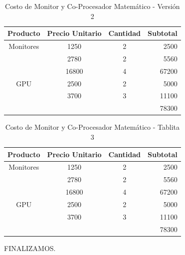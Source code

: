 \documentclass[]{article}
\begin{document}
\begin{table}[h]
	\centering
	\begin{tabular}{cccr}
		\hline
		Producto & Precio Unitario & Cantidad & Subtotal \\
		\hline
		Monitores & 1250 & 2 & 2500\\
		& 2780 & 2 & 5560 \\
		& 16800 & 4 & 67200 \\
		\hline
		GPU	 	  & 2500 & 2 & 5000\\
		& 3700 & 3 & 11100\\
		\cline{4-4}
		&      &   & 78300
	\end{tabular}
	\caption{Costo de Monitor y Co-Procesador Matemático - Versión 2}
	\label{table:2}
\end{table}

\lipsum[11-14]
\begin{table}[h]
	\centering
	\begin{tabular}{cccr}
		\hline
		Producto & Precio Unitario & Cantidad & Subtotal \\
		\hline
		Monitores & 1250 & 2 & 2500\\
		& 2780 & 2 & 5560 \\
		& 16800 & 4 & 67200 \\
		\hline
		GPU	 	  & 2500 & 2 & 5000\\
		& 3700 & 3 & 11100\\
		\cline{4-4}
		&      &   & 78300
	\end{tabular}
	\caption{Costo de Monitor y Co-Procesador Matemático - Tablita 3}
	\label{table:3}
\end{table}

FINALIZAMOS.
\newpage
\listoftables
\newpage
\listoffigures
\newpage
\tableofcontents
\end{document}
